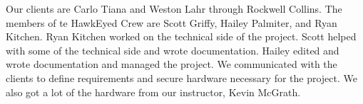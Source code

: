 \par
Our clients are Carlo Tiana and Weston Lahr through Rockwell Collins.
The members of te HawkEyed Crew are Scott Griffy, Hailey Palmiter, and Ryan Kitchen.
Ryan Kitchen worked on the technical side of the project. Scott helped with some of the technical side and wrote documentation. Hailey edited and wrote documentation and managed the project.
We communicated with the clients to define requirements and secure hardware necessary for the project. We also got a lot of the hardware from our instructor, Kevin McGrath.
